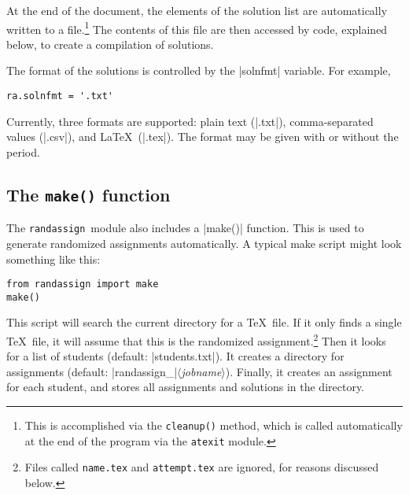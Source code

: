 \documentclass[11pt]{article}
\newcommand{\ra}{\texttt{randassign}}
\begin{document}
At the end of the document, the elements of the solution list are automatically written to a file.\footnote{This is accomplished via the \texttt{cleanup()} method, which is called automatically at the end of the program via the \texttt{atexit} module.}  The contents of this file are then accessed by code, explained below, to create a compilation of solutions.

The format of the solutions is controlled by the |solnfmt| variable.  For example,
\begin{Verbatim}
ra.solnfmt = '.txt'
\end{Verbatim}
Currently, three formats are supported:  plain text (|.txt|), comma-separated values (|.csv|), and \LaTeX\ (|.tex|).  The format may be given with or without the period.


\subsection{The \texttt{make()} function}

The \ra\ module also includes a |make()| function.  This is used to generate randomized assignments automatically.  A typical make script might look something like this:
\begin{Verbatim}
from randassign import make
make()
\end{Verbatim}
This script will search the current directory for a \TeX\ file.  If it only finds a single \TeX\ file, it will assume that this is the randomized assignment.\footnote{Files called \texttt{name.tex} and \texttt{attempt.tex} are ignored, for reasons discussed below.}  Then it looks for a list of students (default:  |students.txt|).  It creates a directory for assignments (default: |randassign_|$\langle$\textit{jobname}$\rangle$).  Finally, it creates an assignment for each student, and stores all assignments and solutions in the directory.
\end{document}
